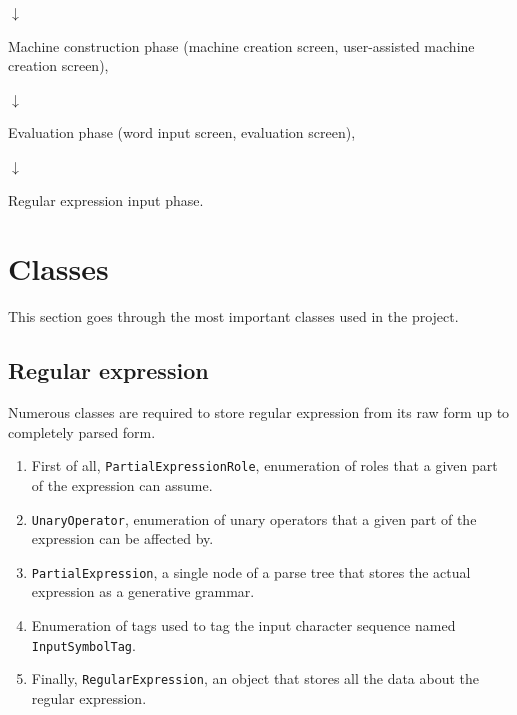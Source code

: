 \documentclass{article}
\begin{document}
$ \downarrow $

Machine construction phase (machine creation screen, user-assisted machine creation screen),

$ \downarrow $

Evaluation phase (word input screen, evaluation screen),

$ \downarrow $

Regular expression input phase.

\newpage

\section{Classes}
This section goes through the most important classes used in the project.

\subsection{Regular expression}
Numerous classes are required to store regular expression from its raw form up to completely parsed
form.

\begin{enumerate}

  \item First of all, \verb|PartialExpressionRole|, enumeration of roles that a given part of the
  expression can assume.

  \item \verb|UnaryOperator|, enumeration of unary operators that a given part of the expression can
  be affected by.

  \item \verb|PartialExpression|, a single node of a parse tree that stores the actual
  expression as a generative grammar.

  \item Enumeration of tags used to tag the input character sequence named \verb|InputSymbolTag|.

  \item Finally, \verb|RegularExpression|, an object that stores all the data about the regular expression.

\end{enumerate}

% 
\end{document}

